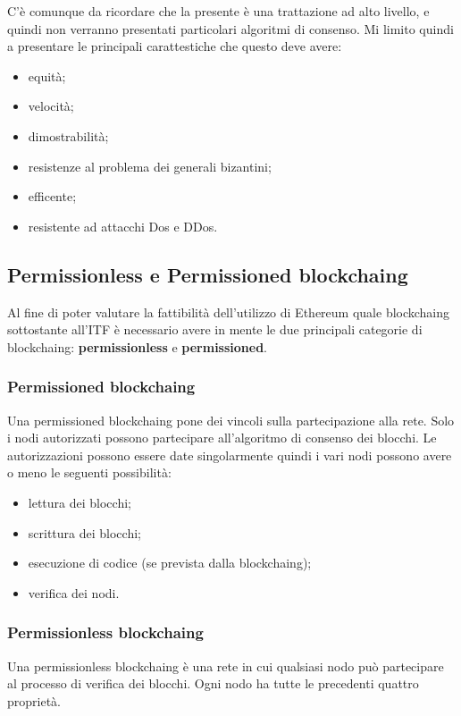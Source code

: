 C'è comunque da ricordare che la presente è una trattazione ad alto livello, e quindi non verranno presentati particolari algoritmi di consenso. Mi limito quindi a presentare le principali carattestiche che questo deve avere:
\begin{itemize}
    \item equità;
    \item velocità;
    \item dimostrabilità;
    \item resistenze al problema dei generali bizantini;
    \item efficente;
    \item resistente ad attacchi Dos e DDos.
\end{itemize}

\subsection{Permissionless e Permissioned \gls{blockchaing}}
Al fine di poter valutare la fattibilità dell’utilizzo di Ethereum quale \gls{blockchaing} sottostante all’ITF è necessario avere in mente le due principali categorie di \gls{blockchaing}: \textbf{permissionless} e \textbf{permissioned}.

\subsubsection{Permissioned \gls{blockchaing}}
Una permissioned \gls{blockchaing} pone dei vincoli sulla partecipazione alla rete. Solo i nodi autorizzati possono partecipare all’algoritmo di consenso dei blocchi. Le autorizzazioni possono essere date singolarmente quindi i vari nodi possono avere o meno le seguenti possibilità:
\begin{itemize}
    \item lettura dei blocchi;
    \item scrittura dei blocchi;
    \item esecuzione di codice (se prevista dalla \gls{blockchaing});
    \item verifica dei nodi.
\end{itemize}

\subsubsection{Permissionless blockchaing}
Una permissionless \gls{blockchaing} è una rete in cui qualsiasi nodo può partecipare al processo di verifica dei blocchi. Ogni nodo ha tutte le precedenti quattro proprietà.

